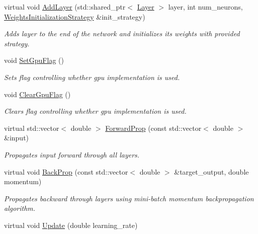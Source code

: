 \begin{DoxyCompactItemize}
virtual void \hyperlink{classneuralnet_1_1Net_a12e3eab09024035ce46c8034138d8a62}{Add\+Layer} (std\+::shared\+\_\+ptr$<$ \hyperlink{classneuralnet_1_1Layer}{Layer} $>$ layer, int num\+\_\+neurons, \hyperlink{classneuralnet_1_1WeightsInitializationStrategy}{Weights\+Initialization\+Strategy} \&init\+\_\+strategy)
\begin{DoxyCompactList}\small\item\em Adds layer to the end of the network and initializes its weights with provided strategy. \end{DoxyCompactList}\item 
\mbox{\label{classneuralnet_1_1Net_a0457c5c1ef86b843f4096a8ace3ad908}} 
void \hyperlink{classneuralnet_1_1Net_a0457c5c1ef86b843f4096a8ace3ad908}{Set\+Gpu\+Flag} ()
\begin{DoxyCompactList}\small\item\em Sets flag controlling whether gpu implementation is used. \end{DoxyCompactList}\item 
\mbox{\label{classneuralnet_1_1Net_a3dcd162920af37bf02fcfaf9cb759f0d}} 
void \hyperlink{classneuralnet_1_1Net_a3dcd162920af37bf02fcfaf9cb759f0d}{Clear\+Gpu\+Flag} ()
\begin{DoxyCompactList}\small\item\em Clears flag controlling whether gpu implementation is used. \end{DoxyCompactList}\item 
virtual std\+::vector$<$ double $>$ \hyperlink{classneuralnet_1_1Net_a0129f8d6a5e624665cd3922fef79493d}{Forward\+Prop} (const std\+::vector$<$ double $>$ \&input)
\begin{DoxyCompactList}\small\item\em Propagates input forward through all layers. \end{DoxyCompactList}\item 
virtual void \hyperlink{classneuralnet_1_1Net_af6d95fdc4ccdc37d7150668fc74e8a36}{Back\+Prop} (const std\+::vector$<$ double $>$ \&target\+\_\+output, double momentum)
\begin{DoxyCompactList}\small\item\em Propagates backward through layers using mini-\/batch momentum backpropagation algorithm. \end{DoxyCompactList}\item 
virtual void \hyperlink{classneuralnet_1_1Net_a541fcd626459752b0de09a2a150f3d2a}{Update} (double learning\+\_\+rate)

\end{DoxyCompactItemize}
